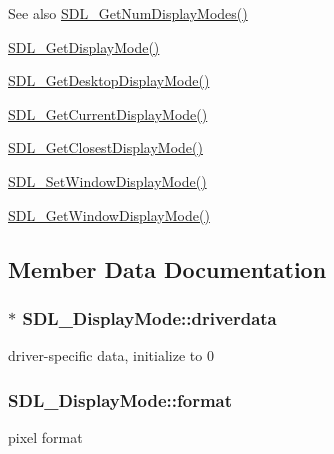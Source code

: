\begin{DoxySeeAlso}{See also}
\hyperlink{_s_d_l__video_8h_a5abcf18592f00019c517e791f8ba53fc}{S\+D\+L\+\_\+\+Get\+Num\+Display\+Modes()} 

\hyperlink{_s_d_l__video_8h_a0a53e003ec6ad24dd2bbbcd0ad297311}{S\+D\+L\+\_\+\+Get\+Display\+Mode()} 

\hyperlink{_s_d_l__video_8h_ab97bca68fc068a6ecc3db473c4c0defd}{S\+D\+L\+\_\+\+Get\+Desktop\+Display\+Mode()} 

\hyperlink{_s_d_l__video_8h_a14dce1cb33085b36f08d27b3d8f2335b}{S\+D\+L\+\_\+\+Get\+Current\+Display\+Mode()} 

\hyperlink{_s_d_l__video_8h_a794be92ee0a9efca226fa19a635fa470}{S\+D\+L\+\_\+\+Get\+Closest\+Display\+Mode()} 

\hyperlink{_s_d_l__video_8h_a2ca17d1e857d1560738e002c9935088a}{S\+D\+L\+\_\+\+Set\+Window\+Display\+Mode()} 

\hyperlink{_s_d_l__video_8h_a8185547bc7cb0bbeb400f459792d081a}{S\+D\+L\+\_\+\+Get\+Window\+Display\+Mode()} 
\end{DoxySeeAlso}


\subsection{Member Data Documentation}
\subsubsection[{\texorpdfstring{driverdata}{driverdata}}]{$\ast$ S\+D\+L\+\_\+\+Display\+Mode\+::driverdata}\hypertarget{struct_s_d_l___display_mode_a411f93025411da873f37a384ae62bbcf}{}\label{struct_s_d_l___display_mode_a411f93025411da873f37a384ae62bbcf}
driver-\/specific data, initialize to 0 
\subsubsection[{\texorpdfstring{format}{format}}]{ S\+D\+L\+\_\+\+Display\+Mode\+::format}\hypertarget{struct_s_d_l___display_mode_ae8120e0a18a99992f039756e1b503680}{}\label{struct_s_d_l___display_mode_ae8120e0a18a99992f039756e1b503680}
pixel format 
